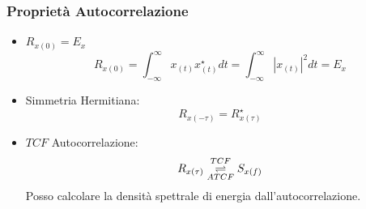         \subsubsection{Proprietà Autocorrelazione}
            \begin{itemize}
                \item {$R_{x(0)} = E_x$
                    \[
                        R_{x(0)} =\int_{-\infty}^{\infty}x_{(t)}x_{(t)}^\star dt =\int_{-\infty}^{\infty}|x_{(t)}|^2 dt = E_x   
                    \]
                }
                \item {Simmetria Hermitiana:
                    \[
                        R_{x(-\tau)} =R_{x(\tau)}^\star 
                    \]
                }
                \item {$TCF$ Autocorrelazione:
                    \[ 
                        R_{x(\tau)} \overunderset{TCF}{ATCF}{\rightleftharpoons} S_{x(f)}
                    \]
                    Posso calcolare la densità spettrale di energia dall'autocorrelazione.
                }
            \end{itemize}
